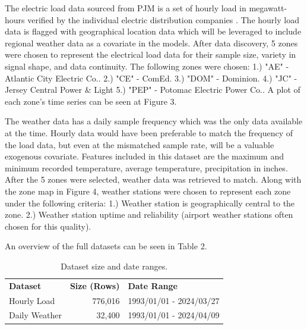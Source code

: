 \documentclass[sigconf]{acmart}
\begin{document}
  The electric load data sourced from PJM is a set of hourly load in megawatt-hours verified by the individual electric distribution companies \cite{PJMLoad24}. The hourly load data is flagged with geographical location data which will be leveraged to include regional weather data as a covariate in the models. After data discovery, 5 zones were chosen to represent the electrical load data for their sample size, variety in signal shape, and data continuity. The following zones were chosen: 1.) "AE" - Atlantic City Electric Co.. 2.) "CE" - ComEd. 3.) "DOM" - Dominion. 4.) "JC" - Jersey Central Power \& Light 5.) "PEP" - Potomac Electric Power Co.. A plot of each zone's time series can be seen at Figure 3.
  
  The weather data has a daily sample frequency which was the only data available at the time. Hourly data would have been preferable to match the frequency of the load data, but even at the mismatched sample rate, will be a valuable exogenous covariate. Features included in this dataset are the maximum and minimum recorded temperature, average temperature, precipitation in inches. After the 5 zones were selected, weather data was retrieved to match. Along with the zone map in Figure 4, weather stations were chosen to represent each zone under the following criteria: 1.) Weather station is geographically central to the zone. 2.) Weather station uptime and reliability (airport weather stations often chosen for this quality).
  
  An overview of the full datasets can be seen in Table 2.
  
  \begin{table}[hbt!]
\centering
\caption{Dataset size and date ranges.}
\begin{tabular}{lrl}
\toprule
\textbf{Dataset} & \hfil \textbf{Size (Rows)} & \textbf{Date Range} \\
\cmidrule(rl){1-1}\cmidrule(rl){2-2}\cmidrule(rl){3-3}
  Hourly Load & 776,016 & 1993/01/01 - 2024/03/27 \\
  Daily Weather & 32,400 & 1993/01/01 - 2024/04/09  \\   
  \bottomrule
\end{tabular}
\end{table}
\end{document}
